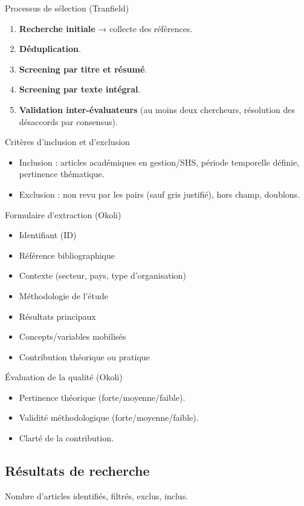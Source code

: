 \documentclass[a4paper,12pt]{article}
\begin{document}
Processus de sélection (Tranfield)
\begin{enumerate}
\item \textbf{\textbf{Recherche initiale}} → collecte des références.
\item \textbf{\textbf{Déduplication}}.
\item \textbf{\textbf{Screening par titre et résumé}}.
\item \textbf{\textbf{Screening par texte intégral}}.
\item \textbf{\textbf{Validation inter-évaluateurs}} (au moins deux chercheurs, résolution des désaccords par consensus).
\end{enumerate}

Critères d’inclusion et d'exclusion
\begin{itemize}
\item Inclusion : articles académiques en gestion/SHS, période temporelle définie, pertinence thématique.
\item Exclusion : non revu par les pairs (sauf gris justifié), hors champ, doublons.
\end{itemize}

Formulaire d’extraction (Okoli)
\begin{itemize}
\item Identifiant (ID)
\item Référence bibliographique
\item Contexte (secteur, pays, type d’organisation)
\item Méthodologie de l’étude
\item Résultats principaux
\item Concepts/variables mobilisés
\item Contribution théorique ou pratique
\end{itemize}

Évaluation de la qualité (Okoli)
\begin{itemize}
\item Pertinence théorique (forte/moyenne/faible).
\item Validité méthodologique (forte/moyenne/faible).
\item Clarté de la contribution.
\end{itemize}
\subsection{Résultats de recherche}
\label{sec:org708ca7c}
Nombre d’articles identifiés, filtrés, exclus, inclus.
\end{document}
